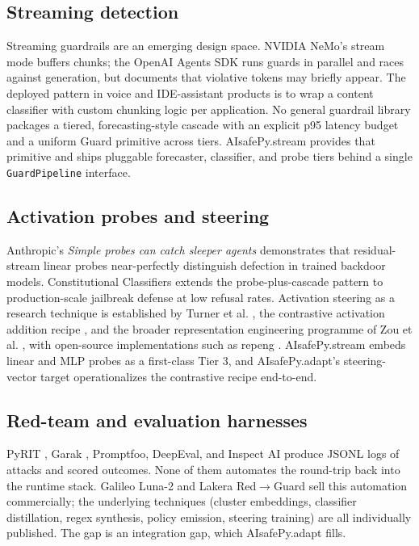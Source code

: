 \subsection{Streaming detection}

Streaming guardrails are an emerging design space. NVIDIA NeMo's
stream mode buffers chunks; the OpenAI Agents SDK runs guards in
parallel and races against generation, but documents that violative
tokens may briefly appear. The deployed pattern in voice and
IDE-assistant products is to wrap a content classifier with custom
chunking logic per application. No general guardrail library
packages a tiered, forecasting-style cascade with an explicit p95
latency budget and a uniform Guard primitive across tiers.
AIsafePy.stream provides that primitive and ships pluggable
forecaster, classifier, and probe tiers behind a single
\texttt{GuardPipeline} interface.

\subsection{Activation probes and steering}

Anthropic's \textit{Simple probes can catch sleeper agents}
\citep{anthropicprobes} demonstrates that residual-stream linear
probes near-perfectly distinguish defection in trained backdoor
models. Constitutional Classifiers \citep{sharma2025constclass}
extends the probe-plus-cascade pattern to production-scale
jailbreak defense at low refusal rates. Activation steering as a
research technique is established by Turner et al.
\citep{turner2023steering}, the contrastive activation addition
recipe \citep{panickssery2023cad}, and the broader representation
engineering programme of Zou et al. \citep{zou2023repe}, with
open-source implementations such as repeng \citep{repeng}.
AIsafePy.stream embeds linear and MLP probes as a first-class
Tier 3, and AIsafePy.adapt's steering-vector target operationalizes
the contrastive recipe end-to-end.

\subsection{Red-team and evaluation harnesses}

PyRIT \citep{pyrit}, Garak \citep{garak}, Promptfoo, DeepEval, and
Inspect AI \citep{inspectai} produce JSONL logs of attacks and
scored outcomes. None of them automates the round-trip back into the
runtime stack. Galileo Luna-2 and Lakera Red$\rightarrow$Guard sell
this automation commercially; the underlying techniques (cluster
embeddings, classifier distillation, regex synthesis, policy
emission, steering training) are all individually published. The
gap is an integration gap, which AIsafePy.adapt fills.

